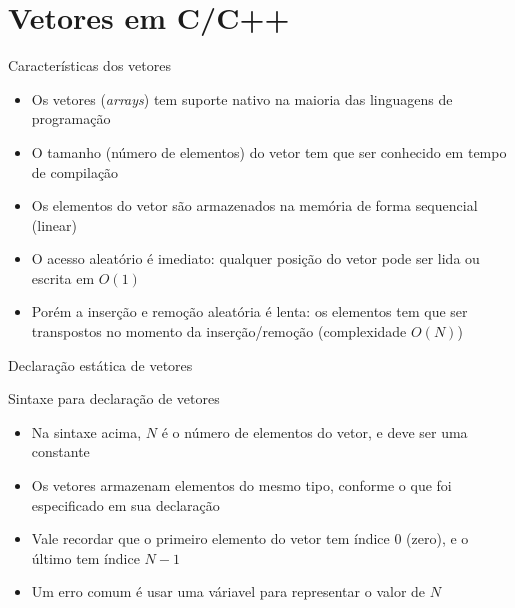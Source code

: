\section{Vetores em C/C++}

\begin{frame}[fragile]{Características dos vetores}

	\begin{itemize}
		\item Os vetores (\textit{arrays}) tem suporte nativo na maioria das linguagens de 
        programação

		\item O tamanho (número de elementos) do vetor tem que ser conhecido em tempo de compilação

		\item Os elementos do vetor são armazenados na memória de forma sequencial (linear)

		\item O acesso aleatório é imediato: qualquer posição do vetor pode ser lida ou escrita
		em $O(1)$

		\item Porém a inserção e remoção aleatória é lenta: os elementos tem que ser transpostos no         momento da inserção/remoção (complexidade $O(N)$)
	\end{itemize}

\end{frame} 

\begin{frame}[fragile]{Declaração estática de vetores}

    \begin{block}{Sintaxe para declaração de vetores}
    \end{block}

	\begin{itemize}
		\item Na sintaxe acima, $N$ é o número de elementos do vetor, e deve ser 
        uma constante

		\item Os vetores armazenam elementos do mesmo tipo, conforme o que foi especificado em sua 
        declaração

        \item Vale recordar que o primeiro elemento do vetor tem índice 0 (zero), e o último tem
        índice $N - 1$

        \item Um erro comum é usar uma váriavel para representar o valor de $N$
	\end{itemize}

\end{frame}

